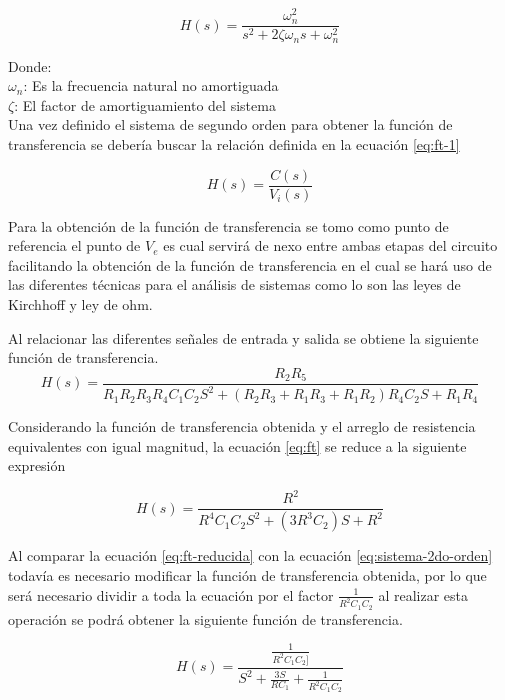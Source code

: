 \documentclass[conference]{IEEEtran}
\begin{document}
	\begin{equation}
		H(s) = \frac{\omega_n^2}{s^2 + 2\zeta\omega_n s + \omega_n^2}
		\label{eq:sistema-2do-orden}
	\end{equation}
	
	Donde: \\ 
	$\omega_n$: Es la frecuencia natural no amortiguada \\
	$\zeta$: El factor de amortiguamiento del sistema \\
	
	Una vez definido el sistema de segundo orden para obtener la función de transferencia se debería buscar la relación definida en la ecuación \ref{eq:ft-1}
	
	\begin{equation}
		H(s) = \frac{C(s)}{V_i(s)}
		\label{eq:ft-1}
	\end{equation}
	
	Para la obtención de la función de transferencia se tomo como punto de referencia el punto de $V_e$ es cual servirá de nexo entre ambas etapas del circuito facilitando la obtención de la función de transferencia en el cual se hará uso de las diferentes técnicas para el análisis de sistemas como lo son las leyes de Kirchhoff y ley de ohm.
	
	Al relacionar las diferentes señales de entrada y salida se obtiene la siguiente función de transferencia.
	{\small
		\begin{equation}
			H(s) = \frac{R_2 R_5}{R_1 R_2 R_3 R_4 C_1 C_2 S^2 + (R_2 R_3 + R_1 R_3 + R_1 R_2)R_4 C_2 S + R_1 R_4}
			\label{eq:ft}
		\end{equation}
	}	
	
	Considerando la función de transferencia obtenida y el arreglo de resistencia equivalentes con igual magnitud, la ecuación \ref{eq:ft} se reduce a la siguiente expresión
	
	\begin{equation}
		H(s) = \frac{R^2}{R^4 C_1 C_2 S^2 + (3R^3 C_2)S + R^2}
		\label{eq:ft-reducida}
	\end{equation}
	
	Al comparar la ecuación \ref{eq:ft-reducida} con la ecuación \ref{eq:sistema-2do-orden} todavía es necesario modificar la función de transferencia obtenida, por lo que será necesario dividir a toda la ecuación por el factor $\frac{1}{R^2 C_1 C_2}$ al realizar esta operación se podrá obtener la siguiente función de transferencia.
	
	\begin{equation}
		H(s) = \frac{ \frac{1}{R^2C_1C_2]} }{ S^2 + \frac{3S}{RC_1} + \frac{1}{R^2C_1C_2}}
		\label{eq:ft-final}
	\end{equation}
	
\end{document}
